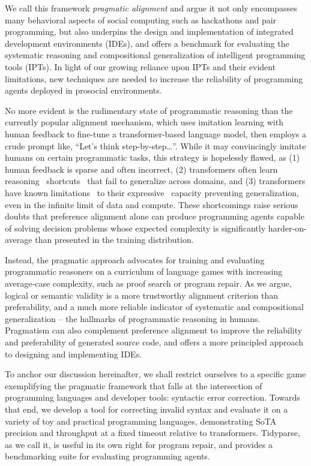 \documentclass[sigplan,screen]{acmart}
\begin{document}
We call this framework \emph{pragmatic alignment} and argue it not only encompasses many behavioral aspects of social computing such as hackathons and pair programming, but also underpins the design and implementation of integrated development environments (IDEs), and offers a benchmark for evaluating the systematic reasoning and compositional generalization of intelligent programming tools (IPTs). In light of our growing reliance upon IPTs and their evident limitations, new techniques are needed to increase the reliability of programming agents deployed in prosocial environments.

No more evident is the rudimentary state of programmatic reasoning than the currently popular alignment mechanism, which uses imitation learning with human feedback to fine-tune a transformer-based language model, then employs a crude prompt like, ``Let's think step-by-step\ldots''. While it may convincingly imitate humans on certain programmatic tasks, this strategy is hopelessly flawed, as (1) human feedback is sparse and often incorrect, (2) transformers often learn reasoning~\cite{dziri2023faith} shortcuts~\cite{liu2022transformers} that fail to generalize across domains, and (3) transformers have known limitations~\cite{merrill2022saturated} to their expressive~\cite{chiang2023tighter} capacity preventing generalization, even in the infinite limit of data and compute. These shortcomings raise serious doubts that preference alignment alone can produce programming agents capable of solving decision problems whose expected complexity is significantly harder-on-average than presented in the training distribution.

Instead, the pragmatic approach advocates for training and evaluating programmatic reasoners on a curriculum of language games with increasing average-case complexity, such as proof search or program repair. As we argue, logical or semantic validity is a more trustworthy alignment criterion than preferability, and a much more reliable indicator of systematic and compositional generalization -- the hallmarks of programmatic reasoning in humans. Pragmatism can also complement preference alignment to improve the reliability and preferability of generated source code, and offers a more principled approach to designing and implementing IDEs.

To anchor our discussion hereinafter, we shall restrict ourselves to a specific game exemplifying the pragmatic framework that falls at the intersection of programming languages and developer tools: syntactic error correction. Towards that end, we develop a tool for correcting invalid syntax and evaluate it on a variety of toy and practical programming languages, demonstrating SoTA precision and throughput at a fixed timeout relative to transformers. Tidyparse, as we call it, is useful in its own right for program repair, and provides a benchmarking suite for evaluating programming agents.
\end{document}
